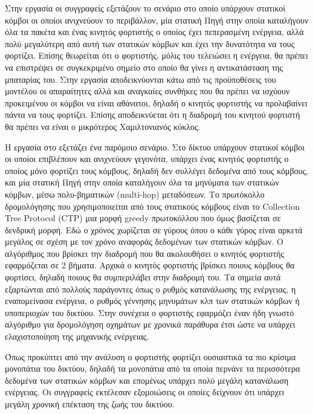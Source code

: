 Στην εργασία \cite{immortal_wsns} οι συγγραφείς εξετάζουν το σενάριο στο οποίο υπάρχουν στατικοί κόμβοι οι οποίοι ανιχνεύουν το περιβάλλον, μία στατική Πηγή στην
οποία καταλήγουν όλα τα πακέτα και ένας κινητός φορτιστής ο οποίος έχει πεπερασμένη ενέργεια, αλλά πολύ μεγαλύτερη από αυτή των στατικών κόμβων και έχει την
δυνατότητα να τους φορτίζει. Επίσης θεωρείται ότι ο φορτιστής, μόλις του τελειώσει η ενέργεια, θα πρέπει να επιστρέψει σε συγκεκριμένο σημείο στο οποίο θα γίνει η
αντικατάσταση της μπαταρίας του. Στην εργασία αποδεικνύονται κάτω από τις προϋποθέσεις του μοντέλου οι απαραίτητες αλλά και αναγκαίες συνθήκες που θα πρέπει να
ισχύουν προκειμένου οι κόμβοι να είναι αθάνατοι, δηλαδή ο κινητός φορτιστής να προλαβαίνει πάντα να τους φορτίζει. Επίσης αποδεικνύεται ότι η διαδρομή του κινητού
φορτιστή θα πρέπει να είναι ο μικρότερος Χαμιλτονιανός κύκλος.

Η εργασία στο \cite{j-roc} εξετάζει ένα παρόμοιο σενάριο. Στο δίκτυο υπάρχουν στατικοί κόμβοι οι οποίοι επιβλέπουν και ανιχνεύουν γεγονότα, υπάρχει ένας κινητός
φορτιστής ο οποίος μόνο φορτίζει τους κόμβους, δηλαδή δεν συλλέγει δεδομένα από τους κόμβους, και μία στατική Πηγή στην οποία καταλήγουν όλα τα μηνύματα των στατικών
κόμβων, μέσω πολυ-βηματικών (multi-hop) μεταδόσεων. Το πρωτόκολλο δρομολόγησης που χρησιμοποιείται από τους στατικούς κόμβους είναι το Collection Tree Protocol (CTP)
μια μορφή greedy πρωτοκόλλου που όμως βασίζεται σε δενδρική μορφή. Εδώ ο χρόνος χωρίζεται σε γύρους όπου ο κάθε γύρος είναι αρκετά μεγάλος σε σχέση με τον χρόνο
αναφοράς δεδομένων των στατικών κόμβων. Ο αλγόριθμος που βρίσκει την διαδρομή που θα ακολουθήσει ο κινητός φορτιστής εφαρμόζεται σε 2 βήματα. Αρχικά ο κινητός
φορτιστής βρίσκει ποιους κόμβους θα φορτίσει, δηλαδή ποιους θα συμπεριλάβει στην διαδρομή του. Τα σημεία αυτά εξαρτώνται από πολλούς παράγοντες όπως ο ρυθμός
κατανάλωσης της ενέργειας, η εναπομείνασα ενέργεια, ο ρυθμός γέννησης μηνυμάτων κλπ των στατικών κόμβων ή υποπεριοχών του δικτύου. Στην συνέχεια ο φορτιστής
εφαρμόζει έναν ήδη γνωστό αλγόριθμο \cite{VRPTW_solver} για δρομολόγηση οχημάτων με χρονικά παράθυρα έτσι ώστε να υπάρχει ελαχιστοποίηση της μηχανικής ενέργειας.

Όπως προκύπτει από την ανάλυση ο φορτιστής φορτίζει ουσιαστικά τα πιο κρίσιμα μονοπάτια του δικτύου, δηλαδή τα μονοπάτια από τα οποία περνάνε τα περισσότερα δεδομένα
των στατικών κόμβων και επομένως υπάρχει πολύ μεγάλη κατανάλωση ενέργειας. Οι συγγραφείς εκτέλεσαν εξομοιώσεις οι οποίες δείχνουν ότι υπάρχει μεγάλη χρονική επέκταση
της ζωής του δικτύου.


